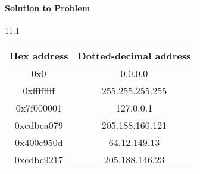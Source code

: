 \documentclass{report}
\begin{document}
\paragraph{Solution to Problem } 11.1\\
\begin{center}
\begin{tabular}{ |c|c| } 
\hline
Hex address & Dotted-decimal address \\ \hline
0x0 & 0.0.0.0 \\
0xffffffff & 255.255.255.255 \\
0x7f000001 & 127.0.0.1 \\
0xcdbca079 & 205.188.160.121 \\
0x400c950d & 64.12.149.13 \\
0xcdbc9217 & 205.188.146.23 \\
\hline
\end{tabular}
\end{center}
\end{document}

